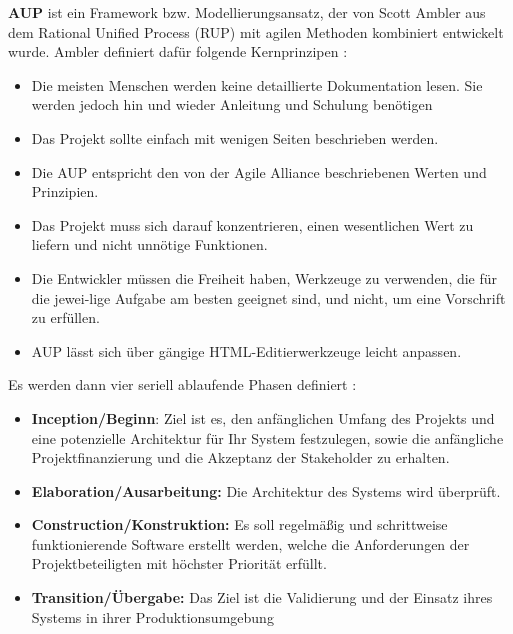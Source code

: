 \textbf{AUP} ist ein Framework bzw. Modellierungsansatz, der von Scott Ambler aus dem Rational Unified Process (RUP) mit agilen Methoden kombiniert entwickelt wurde. 
Ambler definiert dafür folgende Kernprinzipen \cite{Christou2010-vf}:
\begin{itemize}
    \item Die meisten Menschen werden keine detaillierte Dokumentation lesen.  Sie werden jedoch hin und wieder Anleitung und Schulung benötigen
    \item Das Projekt sollte einfach mit wenigen Seiten beschrieben werden.
    \item Die AUP entspricht den von der Agile Alliance beschriebenen Werten und Prinzipien.    
    \item Das Projekt muss sich darauf konzentrieren, einen wesentlichen Wert zu liefern und nicht unnötige Funktionen.
    \item Die Entwickler müssen die Freiheit haben, Werkzeuge zu verwenden, die für die jewei-lige Aufgabe am besten geeignet sind, und nicht, um eine Vorschrift zu erfüllen.
    \item AUP lässt sich über gängige HTML-Editierwerkzeuge leicht anpassen. 
\end{itemize}
Es werden dann vier seriell ablaufende Phasen definiert \cite{Li2010-ge,ShuiYuan2009-or}:
\begin{itemize}
    \item \textbf{Inception/Beginn}: Ziel ist es, den anfänglichen Umfang des Projekts und eine potenzielle Architektur für Ihr System festzulegen, sowie die anfängliche Projektfinanzierung und die Akzeptanz der Stakeholder zu erhalten.
    \item \textbf{Elaboration/Ausarbeitung:} Die Architektur des Systems wird überprüft.
    \item \textbf{Construction/Konstruktion: }Es soll regelmäßig und schrittweise funktionierende Software erstellt werden, welche die Anforderungen der Projektbeteiligten mit höchster Priorität erfüllt.
    \item \textbf{Transition/Übergabe:} Das Ziel ist die Validierung und der Einsatz ihres Systems in ihrer Produktionsumgebung
\end{itemize}

